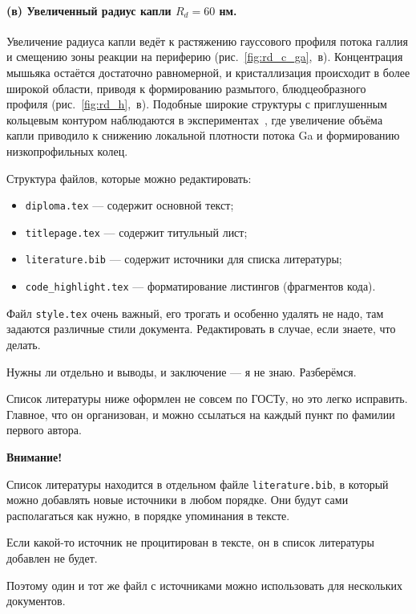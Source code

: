 \documentclass[14pt,oneside]{extarticle}
\begin{document}
\paragraph{(в) Увеличенный радиус капли \(R_d = 60\) нм.}
Увеличение радиуса капли ведёт к растяжению гауссового профиля потока галлия и смещению зоны реакции на периферию (рис.~\ref{fig:rd_c_ga},~в). Концентрация мышьяка остаётся достаточно равномерной, и кристаллизация происходит в более широкой области, приводя к формированию размытого, блюдцеобразного профиля (рис.~\ref{fig:rd_h},~в). Подобные широкие структуры с приглушенным кольцевым контуром наблюдаются в экспериментах~\cite{wang2021droplet}, где увеличение объёма капли приводило к снижению локальной плотности потока Ga и формированию низкопрофильных колец.

\pagebreak
{}
Структура файлов, которые можно редактировать:

\begin{itemize}
    \item \verb|diploma.tex| --- содержит основной текст;
    \item \verb|titlepage.tex| --- содержит титульный лист;
    \item \verb|literature.bib| --- содержит источники для списка литературы;
    \item \verb|code_highlight.tex| --- форматирование листингов (фрагментов кода).
\end{itemize}

Файл \verb|style.tex| очень важный, его трогать и особенно удалять не надо, там задаются различные стили документа. Редактировать в случае, если знаете, что делать.


Нужны ли отдельно и выводы, и заключение --- я не знаю. Разберёмся.

Список литературы ниже оформлен не совсем по ГОСТу, но это легко исправить. Главное, что он организован, и можно ссылаться на каждый пункт по фамилии первого автора.

\textbf{Внимание!} 

Список литературы находится в отдельном файле \verb|literature.bib|, в который можно добавлять новые источники в любом порядке. Они будут сами располагаться как нужно, в порядке упоминания в тексте.

Если какой-то источник не процитирован в тексте, он в список литературы добавлен не будет.

Поэтому один и тот же файл с источниками можно использовать для нескольких документов.


\pagebreak
\printbibliography
\end{document}
